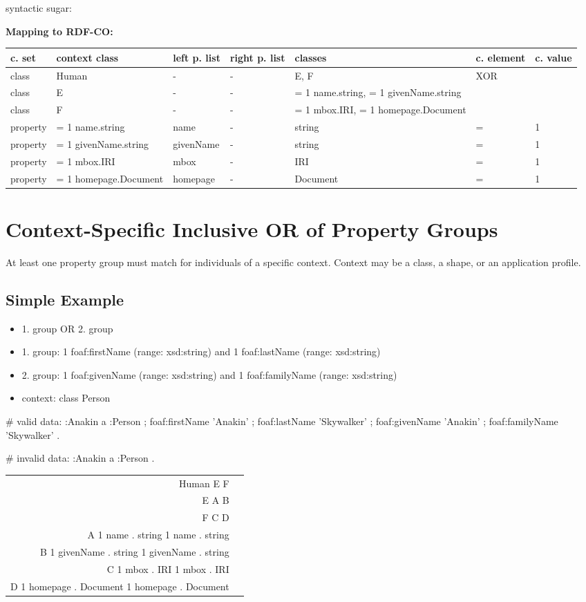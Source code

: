 \documentclass{llncs}
\newenvironment{gcotable}{
  \scriptsize
  \sffamily
  \vspace{0cm}
	\begin{center}
	\textbf{\vspace{0.4cm}Mapping to RDF-CO:} \\
  \begin{tabular}{l|l|l|l|l|l|l}
	\hline
  \textbf{c. set} & \textbf{context class} & \textbf{left p. list} & \textbf{right p. list} & \textbf{classes} & \textbf{c. element} & \textbf{c. value} \\
  \hline

}{
  \hline
  \end{tabular}
	\end{center}
}
\newenvironment{DL}{
\vspace{0cm}
	\begin{center}
  \begin{tabular}{r l}

}{
  \end{tabular}
	\end{center}
}
\begin{document}
syntactic sugar:
\begin{gcotable}
class & Human & - & - & E, F & XOR \\
class & E & - & - & = 1 name.string, = 1 givenName.string &  \\
class & F & - & - & = 1 mbox.IRI, = 1 homepage.Document &  \\
property & = 1 name.string & name & - & string & = & 1 \\
property & = 1 givenName.string & givenName & - & string & = & 1 \\
property & = 1 mbox.IRI & mbox & - & IRI & = & 1 \\
property & = 1 homepage.Document & homepage & - & Document & = & 1 \\
\end{gcotable}


\section{Context-Specific Inclusive OR of Property Groups}

At least one property group must match for individuals of a specific context. 
Context may be a class, a shape, or an application profile.

\subsection{Simple Example}

\begin{itemize}
  \item 1. group OR 2. group
	\item 1. group: 1 foaf:firstName (range: xsd:string) and 1 foaf:lastName (range: xsd:string)
	\item 2. group: 1 foaf:givenName (range: xsd:string) and 1 foaf:familyName (range: xsd:string)
	\item context: class Person
\end{itemize}

\begin{ex}
# valid data:
:Anakin
    a :Person ;
    foaf:firstName 'Anakin' ;
    foaf:lastName 'Skywalker' ;
    foaf:givenName 'Anakin' ;
    foaf:familyName 'Skywalker' .
\end{ex}

\begin{ex}
# invalid data:
:Anakin
    a :Person .
\end{ex}

\begin{DL}
Human  E  F \\ 
E  A  B \\
F  C  D \\
A   1 name . string   1 name . string \\
B   1 givenName . string   1 givenName . string \\
C   1 mbox . IRI   1 mbox . IRI \\
D   1 homepage . Document   1 homepage . Document \\
\end{DL}
\end{document}
